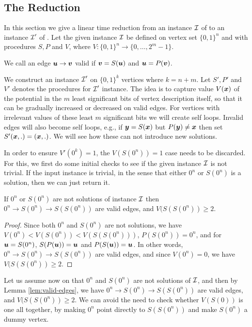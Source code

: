 \subsection{The Reduction}
In this section we give a linear time reduction from an instance $\mbox{${\mathcal I}$}$ of \EOPL to an instance $\mbox{${\mathcal I}$}'$ of \EOML. Let the given \EOPL instance $\mbox{${\mathcal I}$}$ be defined on vertex set $\{0,1\}^n$ and with procedures $S,P$ and $V$, where $V:\{0,1\}^n\rightarrow \{0,\dots,2^m-1\}$.

\medskip

 We call an edge $\mbox{\boldmath $u$} \rightarrow \mbox{\boldmath $v$}$ valid if $\mbox{\boldmath $v$}=S(\mbox{\boldmath $u$})$ and $\mbox{\boldmath $u$}=P(\mbox{\boldmath $v$})$. 
\medskip

We construct an \EOML instance $\mbox{${\mathcal I}$}'$ on $\{0,1\}^k$ vertices where $k=n+m$. 
Let $S',P'$ and $V'$ denotes the procedures for $\mbox{${\mathcal I}$}'$ instance. 
The idea is to capture value $V(\mbox{\boldmath $x$})$ of the potential in the $m$ least significant bits of vertex description itself, so that it can be gradually increased or decreased on valid edges. For vertices with irrelevant values of these least $m$ significant bits we will create self loops. Invalid edges will also become self loops, e.g., if $\mbox{\boldmath $y$}=S(\mbox{\boldmath $x$})$ but $P(\mbox{\boldmath $y$})\neq \mbox{\boldmath $x$}$ then set $S'(\mbox{\boldmath $x$},.)=(\mbox{\boldmath $x$},.)$. We will see how these can not introduce new solutions. 

%
In order to ensure $V'(0^k)=1$, the $V(S(0^n))=1$ case needs to be discarded. For
this, we first do some initial checks to see if the given instance $\mbox{${\mathcal I}$}$ is not
trivial.  If the input \EOPL instance is trivial, in the sense that either
$0^n$ or $S(0^n)$ is a solution, then we can just return it.

\begin{lemma}
\label{lem:valid-edges}
If $0^n$ or $S(0^n)$ are not solutions of \EOPL instance $\mbox{${\mathcal I}$}$ then $0^n
\rightarrow S(0^n) \rightarrow S(S(0^n))$ are valid edges, and $V(S(S(0^n))\ge 2$. 
\end{lemma}

\begin{proof}
Since both $0^n$ and $S(0^n)$ are not solutions, we have
	$V(0^n)<V(S(0^n))<V(S(S(0^n)))$, $P(S(0^n))=0^n$, and for $\mbox{\boldmath $u$} = S(0^n)$,
	$S(P(\mbox{\boldmath $u$}))=\mbox{\boldmath $u$}$ and $P(S(\mbox{\boldmath $u$}))=\mbox{\boldmath $u$}$. In other words, $0^n \rightarrow S(0^n)
	\rightarrow S(S(0^n))$ are valid edges, and since $V(0^n)=0$, we have
	$V(S(S(0^n))\ge 2$. 
\end{proof}

Let us assume now on that $0^n$ and $S(0^n)$ are not solutions of $\mbox{${\mathcal I}$}$, and
then by Lemma \ref{lem:valid-edges}, we have $0^n \rightarrow S(0^n) \rightarrow
S(S(0^n))$ are valid edges, and $V(S(S(0^n))\ge 2$. We can avoid the need to check
whether $V(S(0))$ is one all together, by making $0^n$ point directly to
$S(S(0^n))$ and make $S(0^n)$ a dummy vertex. 

